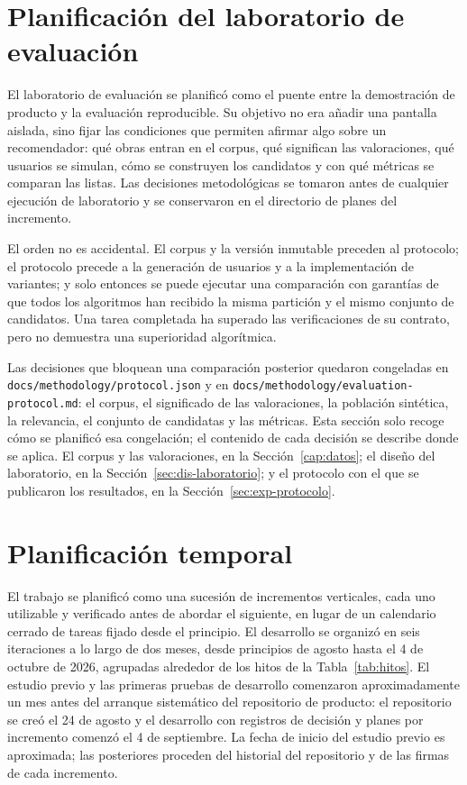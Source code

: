 \section{Planificación del laboratorio de evaluación}\label{sec:met-fase2}

El laboratorio de evaluación se planificó como el puente entre la demostración de producto y la evaluación
reproducible. Su objetivo no era añadir una pantalla aislada, sino fijar las condiciones que
permiten afirmar algo sobre un recomendador: qué obras entran en el corpus, qué significan
las valoraciones, qué usuarios se simulan, cómo se construyen los candidatos y con qué
métricas se comparan las listas. Las decisiones metodológicas se tomaron antes de cualquier
ejecución de laboratorio y se conservaron en el directorio de planes del incremento.

El orden no es accidental. El corpus y la versión inmutable preceden al protocolo; el protocolo
precede a la generación de usuarios y a la implementación de variantes; y solo entonces se
puede ejecutar una comparación con garantías de que todos los algoritmos han recibido la
misma partición y el mismo conjunto de candidatos. Una tarea completada ha superado las
verificaciones de su contrato, pero no demuestra una superioridad algorítmica.

Las decisiones que bloquean una comparación posterior quedaron congeladas en
\texttt{docs/methodology/protocol.json} y en \texttt{docs/methodology/evaluation-protocol.md}:
el corpus, el significado de las valoraciones, la población sintética, la relevancia, el
conjunto de candidatas y las métricas. Esta sección solo recoge cómo se planificó esa
congelación; el contenido de cada decisión se describe donde se aplica. El corpus y las
valoraciones, en la Sección~\ref{cap:datos}; el diseño del laboratorio, en la
Sección~\ref{sec:dis-laboratorio}; y el protocolo con el que se publicaron los resultados, en
la Sección~\ref{sec:exp-protocolo}.

\section{Planificación temporal}\label{sec:met-temporal}

El trabajo se planificó como una sucesión de incrementos verticales, cada uno utilizable y
verificado antes de abordar el siguiente, en lugar de un calendario cerrado de tareas fijado
desde el principio. El desarrollo se organizó en seis iteraciones a lo largo de dos meses,
desde principios de agosto hasta el 4 de octubre de 2026, agrupadas alrededor de los hitos de la
Tabla~\ref{tab:hitos}. El estudio previo y las primeras pruebas de desarrollo comenzaron
aproximadamente un mes antes del arranque sistemático del repositorio de producto: el
repositorio se creó el 24 de agosto y el desarrollo con registros de decisión y planes por
incremento comenzó el 4 de septiembre. La fecha de inicio del estudio previo es aproximada; las
posteriores proceden del historial del repositorio y de las firmas de cada incremento.

